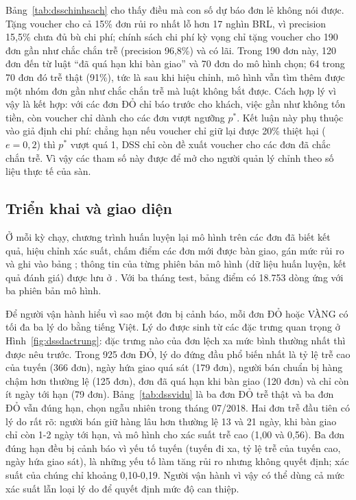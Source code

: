 Bảng~\ref{tab:dsschinhsach} cho thấy điều mà con số dự báo đơn lẻ không nói được. Tặng voucher cho cả 15\% đơn rủi ro nhất lỗ hơn 17 nghìn BRL, vì precision 15,5\% chưa đủ bù chi phí; chính sách chi phí kỳ vọng chỉ tặng voucher cho 190 đơn gần như chắc chắn trễ (precision 96,8\%) và có lãi. Trong 190 đơn này, 120 đơn đến từ luật ``đã quá hạn khi bàn giao'' và 70 đơn do mô hình chọn; 64 trong 70 đơn đó trễ thật (91\%), tức là sau khi hiệu chỉnh, mô hình vẫn tìm thêm được một nhóm đơn gần như chắc chắn trễ mà luật không bắt được. Cách hợp lý vì vậy là kết hợp: với các đơn ĐỎ chỉ báo trước cho khách, việc gần như không tốn tiền, còn voucher chỉ dành cho các đơn vượt ngưỡng $p^{*}$. Kết luận này phụ thuộc vào giả định chi phí: chẳng hạn nếu voucher chỉ giữ lại được 20\% thiệt hại ($e = 0{,}2$) thì $p^{*}$ vượt quá 1, DSS chỉ còn đề xuất voucher cho các đơn đã chắc chắn trễ. Vì vậy các tham số này được để mở cho người quản lý chỉnh theo số liệu thực tế của sàn.

\subsection{Triển khai và giao diện}\label{sec:dsstrienkhai}

Ở mỗi kỳ chạy, chương trình  huấn luyện lại mô hình trên các đơn đã biết kết quả, hiệu chỉnh xác suất, chấm điểm các đơn mới được bàn giao, gán mức rủi ro và ghi vào bảng ; thông tin của từng phiên bản mô hình (dữ liệu huấn luyện, kết quả đánh giá) được lưu ở . Với ba tháng test, bảng điểm có 18.753 dòng ứng với ba phiên bản mô hình.

Để người vận hành hiểu vì sao một đơn bị cảnh báo, mỗi đơn ĐỎ hoặc VÀNG có tối đa ba lý do bằng tiếng Việt. Lý do được sinh từ các đặc trưng quan trọng ở Hình~\ref{fig:dssdactrung}: đặc trưng nào của đơn lệch xa mức bình thường nhất thì được nêu trước. Trong 925 đơn ĐỎ, lý do đứng đầu phổ biến nhất là tỷ lệ trễ cao của tuyến (366 đơn), ngày hứa giao quá sát (179 đơn), người bán chuẩn bị hàng chậm hơn thường lệ (125 đơn), đơn đã quá hạn khi bàn giao (120 đơn) và chỉ còn ít ngày tới hạn (79 đơn). Bảng~\ref{tab:dssvidu} là ba đơn ĐỎ trễ thật và ba đơn ĐỎ vẫn đúng hạn, chọn ngẫu nhiên trong tháng 07/2018. Hai đơn trễ đầu tiên có lý do rất rõ: người bán giữ hàng lâu hơn thường lệ 13 và 21 ngày, khi bàn giao chỉ còn 1-2 ngày tới hạn, và mô hình cho xác suất trễ cao (1,00 và 0,56). Ba đơn đúng hạn đều bị cảnh báo vì yếu tố tuyến (tuyến đi xa, tỷ lệ trễ của tuyến cao, ngày hứa giao sát), là những yếu tố làm tăng rủi ro nhưng không quyết định; xác suất của chúng chỉ khoảng 0,10-0,19. Người vận hành vì vậy có thể dùng cả mức xác suất lẫn loại lý do để quyết định mức độ can thiệp.

